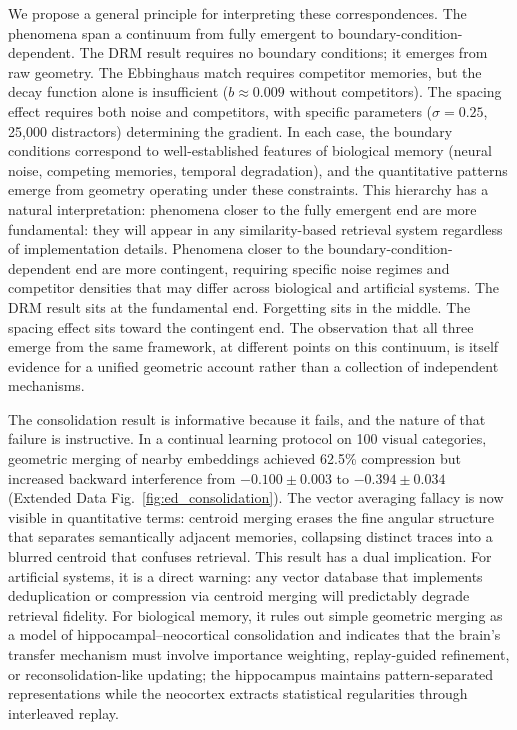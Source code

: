 \documentclass[11pt]{article}
\begin{document}
We propose a general principle for interpreting these correspondences. The phenomena span a continuum from fully emergent to boundary-condition-dependent. The DRM result requires no boundary conditions; it emerges from raw geometry. The Ebbinghaus match requires competitor memories, but the decay function alone is insufficient ($b \approx 0.009$ without competitors). The spacing effect requires both noise and competitors, with specific parameters ($\sigma = 0.25$, 25{,}000 distractors) determining the gradient. In each case, the boundary conditions correspond to well-established features of biological memory (neural noise, competing memories, temporal degradation), and the quantitative patterns emerge from geometry operating under these constraints. This hierarchy has a natural interpretation: phenomena closer to the fully emergent end are more fundamental: they will appear in any similarity-based retrieval system regardless of implementation details. Phenomena closer to the boundary-condition-dependent end are more contingent, requiring specific noise regimes and competitor densities that may differ across biological and artificial systems. The DRM result sits at the fundamental end. Forgetting sits in the middle. The spacing effect sits toward the contingent end. The observation that all three emerge from the same framework, at different points on this continuum, is itself evidence for a unified geometric account rather than a collection of independent mechanisms.

The consolidation result is informative because it fails, and the nature of that failure is instructive. In a continual learning protocol on 100 visual categories, geometric merging of nearby embeddings achieved 62.5\% compression but increased backward interference from $-0.100 \pm 0.003$ to $-0.394 \pm 0.034$ (Extended Data Fig.~\ref{fig:ed_consolidation}). The vector averaging fallacy is now visible in quantitative terms: centroid merging erases the fine angular structure that separates semantically adjacent memories, collapsing distinct traces into a blurred centroid that confuses retrieval. This result has a dual implication. For artificial systems, it is a direct warning: any vector database that implements deduplication or compression via centroid merging will predictably degrade retrieval fidelity. For biological memory, it rules out simple geometric merging as a model of hippocampal--neocortical consolidation and indicates that the brain's transfer mechanism must involve importance weighting, replay-guided refinement\cite{kumaran2012}, or reconsolidation-like updating\cite{nader2003}; the hippocampus maintains pattern-separated representations while the neocortex extracts statistical regularities through interleaved replay\cite{mcclelland1995}.
\end{document}

